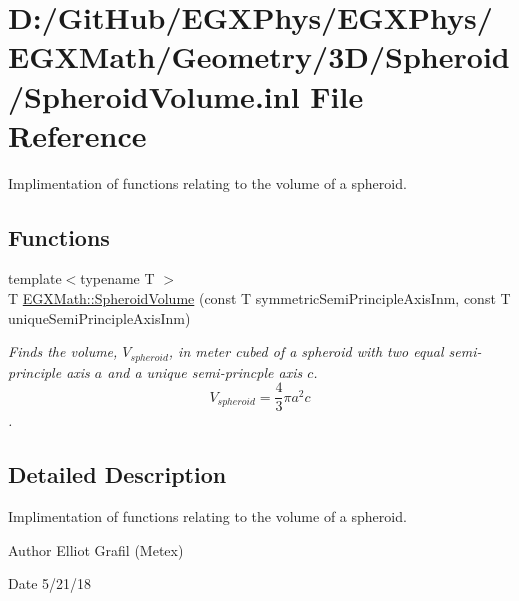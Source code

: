 \hypertarget{_spheroid_volume_8inl}{}\section{D\+:/\+Git\+Hub/\+E\+G\+X\+Phys/\+E\+G\+X\+Phys/\+E\+G\+X\+Math/\+Geometry/3\+D/\+Spheroid/\+Spheroid\+Volume.inl File Reference}
\label{_spheroid_volume_8inl}


Implimentation of functions relating to the volume of a spheroid.  


\subsection*{Functions}
\begin{DoxyCompactItemize}
\item 
{\footnotesize template$<$typename T $>$ }\\T \mbox{\hyperlink{group___e_g_x_math-_geometry-3_d-_spheroid-_volume_gac89ed1e10e56c724b341591ecc5605dc}{E\+G\+X\+Math\+::\+Spheroid\+Volume}} (const T symmetric\+Semi\+Principle\+Axis\+Inm, const T unique\+Semi\+Principle\+Axis\+Inm)
\begin{DoxyCompactList}\small\item\em Finds the volume, $V_{spheroid}$, in meter cubed of a spheroid with two equal semi-\/principle axis $a$ and a unique semi-\/princple axis $c$. \[ V_{spheroid}=\frac{4}{3}\pi a^2 c \]. \end{DoxyCompactList}\end{DoxyCompactItemize}


\subsection{Detailed Description}
Implimentation of functions relating to the volume of a spheroid. 

\begin{DoxyAuthor}{Author}
Elliot Grafil (Metex) 
\end{DoxyAuthor}
\begin{DoxyDate}{Date}
5/21/18 
\end{DoxyDate}

